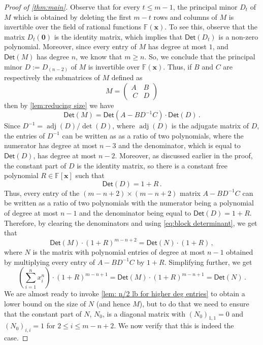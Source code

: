 \documentclass[10pt,a4paper]{article}
\newcommand{\F}{\mathbb{F}}
\newcommand{\vx}{\mathbf{x}}
\newcommand{\Det}{\mathsf{Det}}
\DeclareMathOperator{\adj}{adj}
\begin{document}
\begin{proof}[Proof of \autoref{thm:main}]
Observe that for every $t \leq m-1$, the principal minor $D_t$ of $M$ which is obtained by deleting the first $m -t$ rows and columns of $M$ is invertible over the field of rational functions $\F(\vx)$. To see this, observe that the matrix $D_t(\mathbf{0})$ is the identity matrix, which implies that $\Det(D_t)$ is a non-zero polynomial. Moreover, since every entry of $M$ has degree at most $1$, and $\Det(M)$ has degree $n$, we know that $m \geq n$. So, we conclude that the principal minor $D := D_{(n-2)}$ of $M$ is invertible over $\F(\vx)$. Thus, if $B$ and $C$ are respectively the submatrices of $M$ defined as 
\[ M = \begin{pmatrix}
   A & B\\\
C & D
 \end{pmatrix}
 \]
then by \autoref{lem:reducing size} we have 
 \begin{equation}\label{eq:block determinant}
 \Det(M)  = \Det(A - BD^{-1}C)\cdot \Det(D) \, .
 \end{equation}
Since $D^{-1} = \adj(D)/\det(D)$, where $\adj(D)$ is the adjugate matrix of $D$, the entries of $D^{-1}$ can be written as as a ratio of two polynomials, where the numerator has degree at most $n-3$ and the denominator, which is equal to $\Det(D)$, has degree at most $n-2$. Moreover, as discussed earlier in the proof, 
the constant part of $D$ is the identity matrix, so there is a constant free polynomial $R \in \F[\vx]$
such that 
\[
\Det(D) = 1 + R \, .
\]
Thus, every entry of the $(m-n+2) \times (m-n+2)$ matrix $A - BD^{-1}C$ can be written as a ratio of two polynomials with the numerator being a polynomial of degree at most $n-1$ and the denominator being equal to $\Det(D)= 1 + R$. Therefore, by clearing the denominators and using \eqref{eq:block determinant}, we get that 
 \[
 \Det(M) \cdot (1 + R)^{m - n + 2}  = \Det(N)\cdot (1 + R) \, ,
 \]
 where $N$ is the matrix with polynomial entries of degree at most $n-1$ obtained by multiplying every entry of $A - BD^{-1}C$ by $1 + R$. Simplifying further, we get 
 \[
 \left(\sum_{i=1}^n x_i^n \right) \cdot (1+R)^{m-n+1} = \Det(M) \cdot (1 + R)^{m - n + 1}  = \Det(N)\, .
 \]
 We are almost ready to invoke \autoref{lem: n/2 lb for higher deg entries} to obtain a lower bound on the size of $N$ (and hence $M$), but to do that we need to ensure that the constant part of $N$, $N_0$, is a diagonal matrix with $(N_0)_{1,1}=0$ and $(N_0)_{i,i}=1$ for $2 \le i\le m-n+2$. We now verify that this is indeed the case. 
 

\end{proof}
\end{document}
